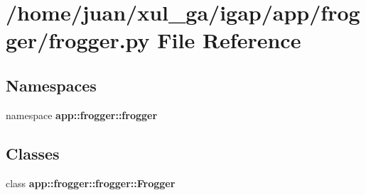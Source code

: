 \section{/home/juan/xul\_\-ga/igap/app/frogger/frogger.py File Reference}
\label{frogger_8py}
\subsection*{Namespaces}
\begin{CompactItemize}
\item 
namespace {\bf app::frogger::frogger}
\end{CompactItemize}
\subsection*{Classes}
\begin{CompactItemize}
\item 
class {\bf app::frogger::frogger::Frogger}
\end{CompactItemize}

